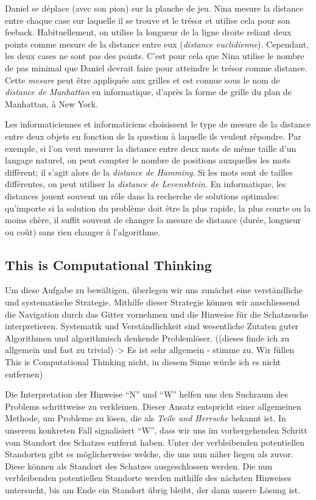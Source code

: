 \documentclass[a4paper,11pt]{report}
\begin{document}
Daniel se déplace (avec son pion) sur la planche de jeu. Nina mesure la distance entre chaque case sur laquelle il se trouve et le trésor et utilise cela pour son feeback. Habituellement, on utilise la longueur de la ligne droite reliant deux points comme mesure de la distance entre eux (\emph{distance euclidienne}). Cependant, les deux cases ne sont pas des points. C’est pour cela que Nina utilise le nombre de pas minimal que Daniel devrait faire pour atteindre le trésor comme distance. Cette \emph{mesure} peut être appliquée aux grilles et est connue sous le nom de \emph{distance de Manhattan} en informatique, d’après la forme de grille du plan de Manhattan, à New York.

Les informaticiennes et informaticiens choisissent le type de mesure de la distance entre deux objets en fonction de la question à laquelle ils veulent répondre. Par exemple, si l’on veut mesurer la distance entre deux mots de même taille d’un langage naturel, on peut compter le nombre de positions auxquelles les mots diffèrent; il s’agit alors de la \emph{distance de Hamming}. Si les mots sont de tailles différentes, on peut utiliser la \emph{distance de Levenshtein}. En informatique, les distances jouent souvent un rôle dans la recherche de solutions optimales: qu’importe si la solution du problème doit être la plus rapide, la plus courte ou la moins chère, il suffit souvent de changer la mesure de distance (durée, longueur ou coût) sans rien changer à l’algorithme.


\subsection*{This is Computational Thinking}

Um diese Aufgabe zu bewältigen, überlegen wir uns zunächst eine verständliche und systematische Strategie. Mithilfe dieser Strategie können wir anschliessend die Navigation durch das Gitter vornehmen und die Hinweise für die Schatzsuche interpretieren. Systematik und Verständlichkeit sind wesentliche Zutaten guter Algorithmen und algorithmisch denkende Problemlöser. ((dieses finde ich zu allgemein und fast zu trivial)–> Es ist sehr allgemein - stimme zu. Wir füllen This is Computational Thinking nicht, in diesem Sinne würde ich es nicht entfernen)

Die Interpretation der Hinweise “N” und “W” helfen uns den Suchraum des Problems schrittweise zu verkleinen. Dieser Ansatz entspricht einer allgemeinen Methode, um Probleme zu lösen, die als \emph{Teile und Herrsche} bekannt ist. In unserem konkreten Fall signalisiert “W”, dass wir uns im vorhergehenden Schritt vom Standort des Schatzes entfernt haben. Unter der verbleibenden potentiellen Standorten gibt es möglicherweise welche, die uns nun näher liegen als zuvor. Diese können als Standort des Schatzes ausgeschlossen werden. Die nun verbleibenden potentiellen Standorte werden mithilfe des nächsten Hinweises untersucht, bis am Ende ein Standort übrig bleibt, der dann unsere Lösung ist.
\end{document}
